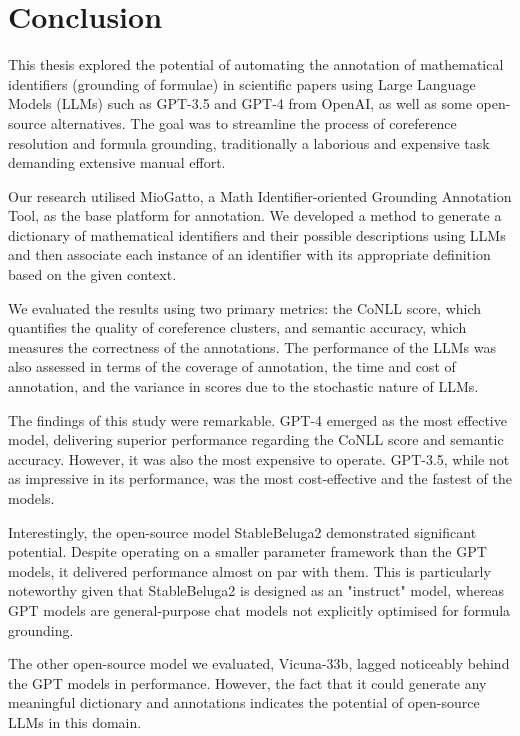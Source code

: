 \chapter{Conclusion}\label{chapter:conclusion}

This thesis explored the potential of automating the annotation of mathematical identifiers (grounding of formulae) in scientific papers using Large Language Models (LLMs) such as GPT-3.5 and GPT-4 from OpenAI, as well as some open-source alternatives. The goal was to streamline the process of coreference resolution and formula grounding, traditionally a laborious and expensive task demanding extensive manual effort. 

Our research utilised MioGatto, a Math Identifier-oriented Grounding Annotation Tool, as the base platform for annotation. We developed a method to generate a dictionary of mathematical identifiers and their possible descriptions using LLMs and then associate each instance of an identifier with its appropriate definition based on the given context. 

We evaluated the results using two primary metrics: the CoNLL score, which quantifies the quality of coreference clusters, and semantic accuracy, which measures the correctness of the annotations. The performance of the LLMs was also assessed in terms of the coverage of annotation, the time and cost of annotation, and the variance in scores due to the stochastic nature of LLMs. 

The findings of this study were remarkable. GPT-4 emerged as the most effective model, delivering superior performance regarding the CoNLL score and semantic accuracy. However, it was also the most expensive to operate. GPT-3.5, while not as impressive in its performance, was the most cost-effective and the fastest of the models. 

Interestingly, the open-source model StableBeluga2 demonstrated significant potential. Despite operating on a smaller parameter framework than the GPT models, it delivered performance almost on par with them. This is particularly noteworthy given that StableBeluga2 is designed as an "instruct" model, whereas GPT models are general-purpose chat models not explicitly optimised for formula grounding. 

The other open-source model we evaluated, Vicuna-33b, lagged noticeably behind the GPT models in performance. However, the fact that it could generate any meaningful dictionary and annotations indicates the potential of open-source LLMs in this domain. 

